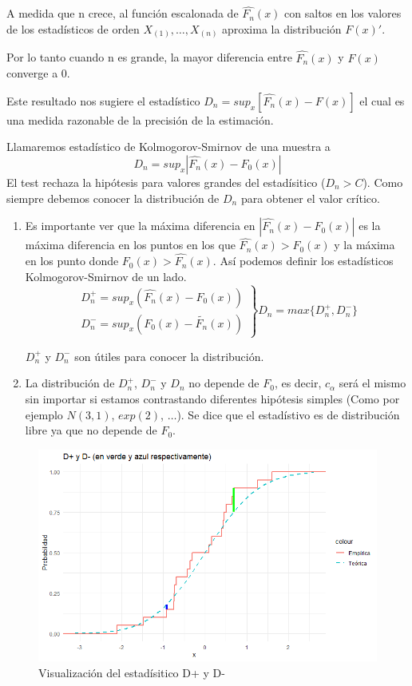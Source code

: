A medida que n crece, al función escalonada de $\widehat{F_n}(x)$ con saltos en los valores de los estadísticos de orden $X_{(1)},\dots,X_{(n)}$ aproxima la distribución $F(x)'$.  %

Por lo tanto cuando n es grande, la mayor diferencia entre $\widehat{F_n}(x)$ y $F(x)$ converge a 0.

Este resultado nos sugiere el estadístico $D_n=sup_x[\widehat{F_n}(x)-F(x)]$ el cual es una medida razonable de la precisión de la estimación.

Llamaremos estadístico de Kolmogorov-Smirnov de una muestra a
\[
    D_n=sup_x|\widehat{F_n}(x)-F_0(x)|
\]
El test rechaza la hipótesis para valores grandes del estadísitico ($D_n>C$).
Como siempre debemos conocer la distribución de $D_n$ para obtener el valor crítico.

\begin{enumerate}
    \item Es importante ver que la máxima diferencia en $|\widehat{F_n}(x)-F_0(x)|$ es la máxima 
    diferencia en los puntos en los que $\widehat{F_n}(x)>F_0(x)$ y la máxima en los punto donde $F_0(x)>\widehat{F_n}(x)$. 
    Así podemos definir los estadísticos Kolmogorov-Smirnov de un lado.
    \[
        \left.\begin{matrix}
                D_n^+=sup_x(\widehat{F_n}(x)-F_0(x)) \\
                D_n^-=sup_x(F_0(x)-\widetilde{F_n}(x))
        \end{matrix}\right\}
        D_n=max\{D_n^+,D_n^-\}
    \]
            
    $D_n^+$ y $D_n^-$ son útiles para conocer la distribución.

    \item La distribución de $D_n^+$, $D_n^-$ y $D_n$ no depende de $F_0$, es decir, $c_\alpha$ será el mismo sin importar si estamos contrastando diferentes hipótesis simples (Como por ejemplo $N(3,1)$, $exp(2)$, $\dots$). Se dice que el estadístivo es de distribución libre ya que no depende de $F_0$.
\end{enumerate}

\begin{figure}[h!]
    \centering
    \includegraphics[width=\textwidth]{assets/EjemploD.png}
    \caption{Visualización del estadísitico D+ y D-}
    \label{fig:Dplus_Dminus}
\end{figure}

